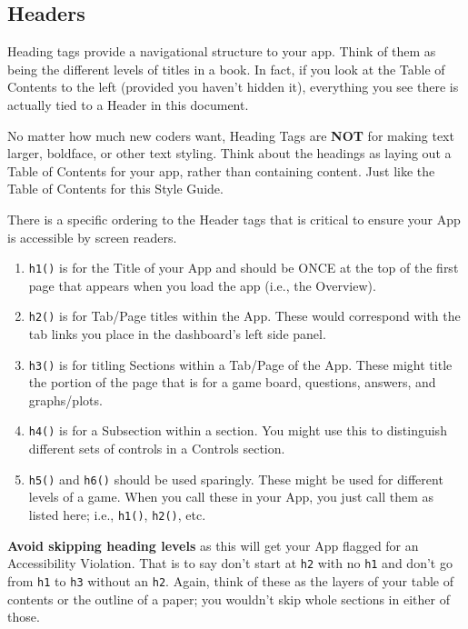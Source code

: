 \documentclass[
]{book}
\providecommand{\tightlist}{%
  \setlength{\itemsep}{0pt}\setlength{\parskip}{0pt}}
\begin{document}
\hypertarget{headers}{%
\subsection{Headers}\label{headers}}

Heading tags provide a navigational structure to your app. Think of them as being the different levels of titles in a book. In fact, if you look at the Table of Contents to the left (provided you haven't hidden it), everything you see there is actually tied to a Header in this document.

No matter how much new coders want, Heading Tags are \textbf{NOT} for making text larger, boldface, or other text styling. Think about the headings as laying out a Table of Contents for your app, rather than containing content. Just like the Table of Contents for this Style Guide.

There is a specific ordering to the Header tags that is critical to ensure your App is accessible by screen readers.

\begin{enumerate}
\def\labelenumi{\arabic{enumi}.}
\tightlist
\item
  \texttt{h1()} is for the Title of your App and should be ONCE at the top of the first page that appears when you load the app (i.e., the Overview).
\item
  \texttt{h2()} is for Tab/Page titles within the App. These would correspond with the tab links you place in the dashboard's left side panel.
\item
  \texttt{h3()} is for titling Sections within a Tab/Page of the App. These might title the portion of the page that is for a game board, questions, answers, and graphs/plots.
\item
  \texttt{h4()} is for a Subsection within a section. You might use this to distinguish different sets of controls in a Controls section.
\item
  \texttt{h5()} and \texttt{h6()} should be used sparingly. These might be used for different levels of a game. When you call these in your App, you just call them as listed here; i.e., \texttt{h1()}, \texttt{h2()}, etc.
\end{enumerate}

\textbf{Avoid skipping heading levels} as this will get your App flagged for an Accessibility Violation. That is to say don't start at \texttt{h2} with no \texttt{h1} and don't go from \texttt{h1} to \texttt{h3} without an \texttt{h2}. Again, think of these as the layers of your table of contents or the outline of a paper; you wouldn't skip whole sections in either of those.
\end{document}
